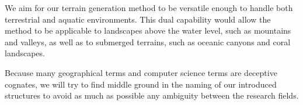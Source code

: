 We aim for our terrain generation method to be versatile enough to handle both terrestrial and aquatic environments. This dual capability would allow the method to be applicable to landscapes above the water level, such as mountains and valleys, as well as to submerged terrains, such as oceanic canyons and coral landscapes.

Because many geographical terms and computer science terms are deceptive cognates, we will try to find middle ground in the naming of our introduced structures to avoid as much as possible any ambiguity between the research fields.


